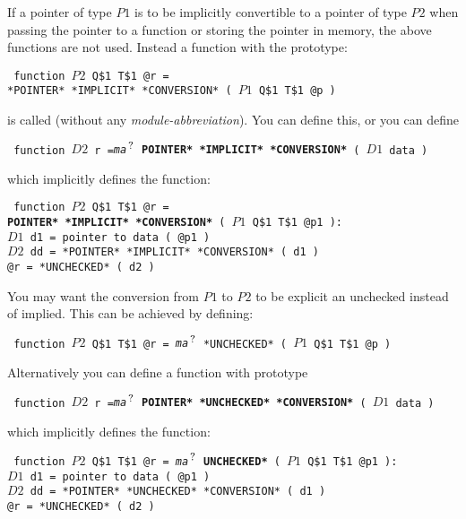 \documentclass[12pt]{article}
\newcommand{\TT}[1]{{\tt \bfseries #1}}
\newcommand{\QMARK}{{$^{\,\mbox{\footnotesize ?}}$}}
\newcommand{\ttkey}[1]{{\tt \bfseries #1}}
\newenvironment{indpar}[1][0.3in]%
	{\begin{list}{}%
		     {\setlength{\itemsep}{0in}%
		      \setlength{\topsep}{0in}%
		      \setlength{\parsep}{1ex}%
		      \setlength{\labelwidth}{#1}%
		      \setlength{\leftmargin}{#1}%
		      \addtolength{\leftmargin}{\labelsep}}%
	 \item}%
	{\end{list}}
\begin{document}
If a pointer of type $P1$ is to be implicitly
convertible to a pointer of type $P2$ when passing the
pointer to a function or storing the pointer in memory,
the above functions are not used.  Instead a function with
the prototype:
\begin{indpar} \tt
function $P2$ Q\$1 T\$1 @r = \\
\hspace*{1in}{\em ma}\QMARK{} *POINTER* *IMPLICIT* *CONVERSION*
                                  ( $P1$ Q\$1 T\$1 @p )
\end{indpar}
is called (without any {\em module-abbreviation}).
You can define this, or you can define
\begin{indpar} \tt
function $D2$ r ={\em ma}\QMARK{}  \ttkey{*POINTER* *IMPLICIT* *CONVERSION*} ( $D1$ data )
\end{indpar}
which implicitly defines the function:
\begin{indpar} \tt
function $P2$ Q\$1 T\$1 @r = \\
\hspace*{1in}{\em ma}\QMARK{} \ttkey{*POINTER* *IMPLICIT* *CONVERSION*}
	( $P1$ Q\$1 T\$1 @p1 ): \\
\hspace*{0.3in}$D1$ d1 = pointer to data ( @p1 ) \\
\hspace*{0.3in}$D2$ dd = *POINTER* *IMPLICIT* *CONVERSION* ( d1 ) \\
\hspace*{0.3in}@r = *UNCHECKED* ( d2 )
\end{indpar}

You may want the conversion from $P1$ to $P2$ to
be explicit an unchecked instead of implied.  This can be achieved by defining:
\begin{indpar} \tt
function $P2$ Q\$1 T\$1 @r = {\em ma}\QMARK{} *UNCHECKED* ( $P1$ Q\$1 T\$1 @p )
\end{indpar}
Alternatively you can define a function with prototype
\begin{indpar} \tt
function $D2$ r ={\em ma}\QMARK{}  \ttkey{*POINTER* *UNCHECKED* *CONVERSION*} ( $D1$ data )
\end{indpar}
which implicitly defines the function:
\begin{indpar} \tt
function $P2$ Q\$1 T\$1 @r = {\em ma}\QMARK{} \TT{*UNCHECKED*}
	( $P1$ Q\$1 T\$1 @p1 ): \\
\hspace*{0.3in}$D1$ d1 = pointer to data ( @p1 ) \\
\hspace*{0.3in}$D2$ dd = *POINTER* *UNCHECKED* *CONVERSION* ( d1 ) \\
\hspace*{0.3in}@r = *UNCHECKED* ( d2 )
\end{indpar}
\end{document}
